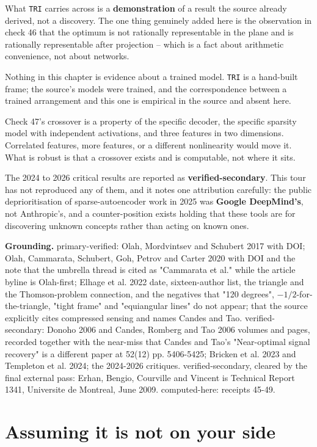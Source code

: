 What \texttt{TRI} carries across is a \textbf{demonstration} of a result the source already derived, not a discovery. The one thing genuinely added here is the observation in check 46 that the optimum is not rationally representable in the plane and is rationally representable after projection -- which is a fact about arithmetic convenience, not about networks.

Nothing in this chapter is evidence about a trained model. \texttt{TRI} is a hand-built frame; the source's models were trained, and the correspondence between a trained arrangement and this one is empirical in the source and absent here.

Check 47's crossover is a property of the specific decoder, the specific sparsity model with independent activations, and three features in two dimensions. Correlated features, more features, or a different nonlinearity would move it. What is robust is that a crossover exists and is computable, not where it sits.

The 2024 to 2026 critical results are reported as \textbf{verified-secondary}. This tour has not reproduced any of them, and it notes one attribution carefully: the public deprioritisation of sparse-autoencoder work in 2025 was \textbf{Google DeepMind's}, not Anthropic's, and a counter-position exists holding that these tools are for discovering unknown concepts rather than acting on known ones.

\textbf{Grounding.} primary-verified: Olah, Mordvintsev and Schubert 2017 with DOI; Olah, Cammarata, Schubert, Goh, Petrov and Carter 2020 with DOI and the note that the umbrella thread is cited as "Cammarata et al." while the article byline is Olah-first; Elhage et al. 2022 date, sixteen-author list, the triangle and the Thomson-problem connection, and the negatives that "120 degrees", $-1/2$-for-the-triangle, "tight frame" and "equiangular lines" do not appear; that the source explicitly cites compressed sensing and names Candes and Tao. verified-secondary: Donoho 2006 and Candes, Romberg and Tao 2006 volumes and pages, recorded together with the near-miss that Candes and Tao's "Near-optimal signal recovery" is a different paper at 52(12) pp. 5406-5425; Bricken et al. 2023 and Templeton et al. 2024; the 2024-2026 critiques. verified-secondary, cleared by the final external pass: Erhan, Bengio, Courville and Vincent is Technical Report 1341, Universite de Montreal, June 2009. computed-here: receipts 45-49.

\chapter{Assuming it is not on your side}

